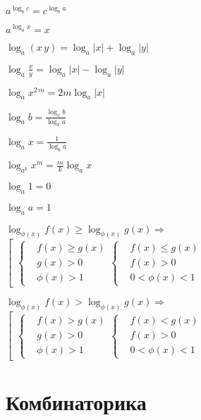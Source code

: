 $ a^{\log_b c} = c^{\log_b a} $

$ a^{\log_a x} = x $

$ \log_a (x\, y) = \log_a |x| + \log_a |y| $

$ \log_a \frac{x}{y} = \log_a |x| - \log_a |y| $

$ \log_a x^{2\, m} = 2m \log_a |x| $

$ \log_a b = \frac{\log_x b}{\log_x a} $

$ \log_a x = \frac{1}{\log_b a} $

$ \log_{a^k} x^m = \frac{m}{k} \log_a x $

$ \log_a 1 = 0 $

$ \log_a a = 1 $

$ \log_{\phi(x)} f(x) \ge \log_{\phi(x)} g(x) \Rightarrow $ $ \left[
	\begin{aligned}
		\left\{ \begin{aligned}
			& f(x) \ge g(x) \\
			& g(x) > 0 \\
			& \phi(x) > 1
		\end{aligned} \right.
		\left\{ \begin{aligned}
			& f(x) \le g(x) \\
			& f(x) > 0 \\
			& 0 < \phi(x) < 1
		\end{aligned} \right.
	\end{aligned} \right. $

$ \log_{\phi(x)} f(x) > \log_{\phi(x)} g(x) \Rightarrow $ $ \left[
	\begin{aligned}
		\left\{ \begin{aligned}
			& f(x) > g(x) \\
			& g(x) > 0 \\
			& \phi(x) > 1
		\end{aligned} \right.
		\left\{ \begin{aligned}
			& f(x) < g(x) \\
			& f(x) > 0 \\
			& 0 < \phi(x) < 1
		\end{aligned} \right.
	\end{aligned} \right. $

	
\section{Комбинаторика}

